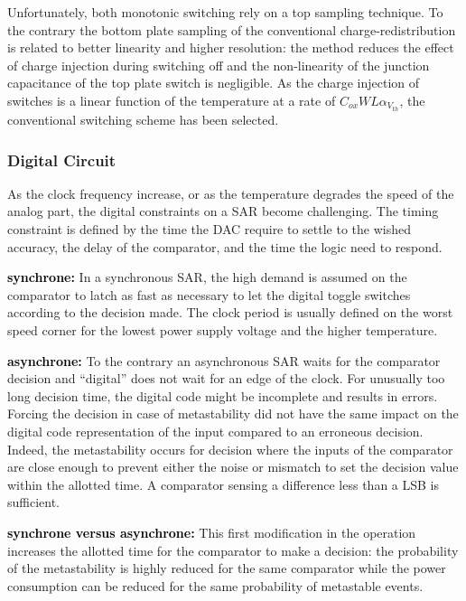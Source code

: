 Unfortunately, both monotonic switching rely on a top sampling technique. To the contrary the bottom plate sampling of the conventional charge-redistribution is related to better linearity and higher resolution: the method reduces the effect of charge injection during switching off and the non-linearity of the junction capacitance of the top plate switch is negligible. As the charge injection of switches is a linear function of the temperature at a rate of \(C_{ox}WL\alpha_{V_{th}}\), the conventional switching scheme has been selected.

	\subsubsection{Digital Circuit}         %
As the clock frequency increase, or as the temperature degrades the speed of the analog part, the digital constraints on a SAR become challenging. The timing constraint is defined by the time the DAC require to settle to the wished accuracy, the delay of the comparator, and the time the logic need to respond.

\textbf{\textcolor{black}{synchrone:}}
In a synchronous SAR, the high demand is assumed on the comparator to latch as fast as necessary to let the digital toggle switches according to the decision made. The clock period is usually defined on the worst speed corner for the lowest power supply voltage and the higher temperature.

\textbf{\textcolor{black}{asynchrone:}}
To the contrary an asynchronous SAR waits for the comparator decision and ``digital'' does not wait for an edge of the clock. For unusually too long decision time, the digital code might be incomplete and results in errors. Forcing the decision in case of metastability did not have the same impact on the digital code representation of the input compared to an erroneous decision. Indeed, the metastability occurs for decision where the inputs of the comparator are close enough to prevent either the noise or mismatch to set the decision value within the allotted time. A comparator sensing a difference less than a LSB is sufficient.

\textbf{\textcolor{black}{synchrone versus asynchrone:}}
This first modification in the operation increases the allotted time for the comparator to make a decision: the probability of the metastability is highly reduced for the same comparator while the power consumption can be reduced for the same probability of metastable events.

